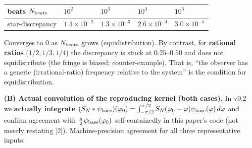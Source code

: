 \documentclass[
]{ltjsarticle}
\newcounter{none} %
\begin{document}
{\def\LTcaptype{none} %
\begin{longtable}[]{@{}
  >{\raggedright\arraybackslash}p{}
  >{\raggedright\arraybackslash}p{}
  >{\raggedright\arraybackslash}p{}
  >{\raggedright\arraybackslash}p{}
  >{\raggedright\arraybackslash}p{}@{}}
\toprule\noalign{}
\begin{minipage}[b]{\linewidth}\raggedright
beats \(N_{\rm beats}\)
\end{minipage} & \begin{minipage}[b]{\linewidth}\raggedright
\(10^2\)
\end{minipage} & \begin{minipage}[b]{\linewidth}\raggedright
\(10^3\)
\end{minipage} & \begin{minipage}[b]{\linewidth}\raggedright
\(10^4\)
\end{minipage} & \begin{minipage}[b]{\linewidth}\raggedright
\(10^5\)
\end{minipage} \\
\midrule\noalign{}
\endhead
\bottomrule\noalign{}
\endlastfoot
star-discrepancy & \(1.4\times10^{-2}\) & \(1.3\times10^{-3}\) &
\(2.6\times10^{-4}\) & \(3.0\times10^{-5}\) \\
\end{longtable}
}

Converges to \(0\) as \(N_{\rm beats}\) grows (equidistribution). By
contrast, for \textbf{rational ratios} (\(1/2,1/3,1/4\)) the discrepancy
is stuck at \(0.25\)--\(0.50\) and does not equidistribute (the fringe
is biased; counter-example). That is, ``the observer has a generic
(irrational-ratio) frequency relative to the system'' is the condition
for equidistribution.

\textbf{(B) Actual convolution of the reproducing kernel (both cases).}
In v0.2 we \textbf{actually integrate}
\((S_N*\psi_{\rm base})(\varphi_0)=\int_{-\pi/2}^{\pi/2}S_N(\varphi_0-\varphi)\psi_{\rm base}(\varphi)\,d\varphi\)
and confirm agreement with \(\tfrac{\pi}{2}\psi_{\rm base}(\varphi_0)\)
self-containedly in this paper's code (not merely restating {[}2{]}).
Machine-precision agreement for all three representative inputs:
\end{document}
